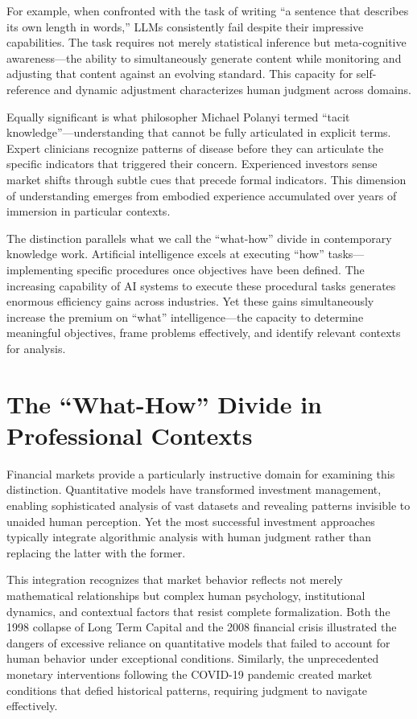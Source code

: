 \documentclass[
  Letterpaper,
]{scrbook}
\begin{document}
For example, when confronted with the task of writing ``a sentence that
describes its own length in words,'' LLMs consistently fail despite
their impressive capabilities. The task requires not merely statistical
inference but meta-cognitive awareness---the ability to simultaneously
generate content while monitoring and adjusting that content against an
evolving standard. This capacity for self-reference and dynamic
adjustment characterizes human judgment across domains.

Equally significant is what philosopher Michael Polanyi termed ``tacit
knowledge''---understanding
that cannot be fully articulated in explicit terms. Expert clinicians
recognize patterns of disease before they can articulate the specific
indicators that triggered their concern. Experienced investors sense
market shifts through subtle cues that precede formal indicators. This
dimension of understanding emerges from embodied experience accumulated
over years of immersion in particular contexts.

The distinction parallels what we call the ``what-how'' divide in
contemporary knowledge work. Artificial intelligence excels at executing
``how'' tasks---implementing specific procedures once objectives have
been defined. The increasing capability of AI systems to execute these
procedural tasks generates enormous efficiency gains across industries.
Yet these gains simultaneously increase the premium on ``what''
intelligence---the capacity to determine meaningful objectives, frame
problems effectively, and identify relevant contexts for analysis.

\section{The ``What-How'' Divide in Professional
Contexts}\label{the-what-how-divide-in-professional-contexts}

Financial markets provide a particularly instructive domain for
examining this distinction. Quantitative models have transformed
investment management, enabling
sophisticated analysis of vast datasets and revealing patterns invisible
to unaided human perception. Yet the most successful investment
approaches typically integrate algorithmic analysis with human judgment
rather than replacing the latter with the former.

This integration recognizes that market behavior reflects not merely
mathematical relationships but complex human psychology, institutional
dynamics, and contextual factors that resist complete formalization.
Both the 1998 collapse of Long Term Capital and the 2008 financial
crisis illustrated the dangers of excessive reliance on quantitative
models that failed to account for human behavior under exceptional
conditions. Similarly, the unprecedented monetary interventions
following the COVID-19 pandemic created market conditions that defied
historical patterns, requiring judgment to navigate effectively.
\end{document}
